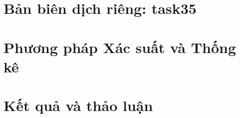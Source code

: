\documentclass[13pt,a4paper,oneside]{extreport}
\begin{document}
\chapter*{Bản biên dịch riêng: task35}
\chapter{Phương pháp Xác suất và Thống kê}

\chapter{Kết quả và thảo luận}

\printbibliography
\end{document}
